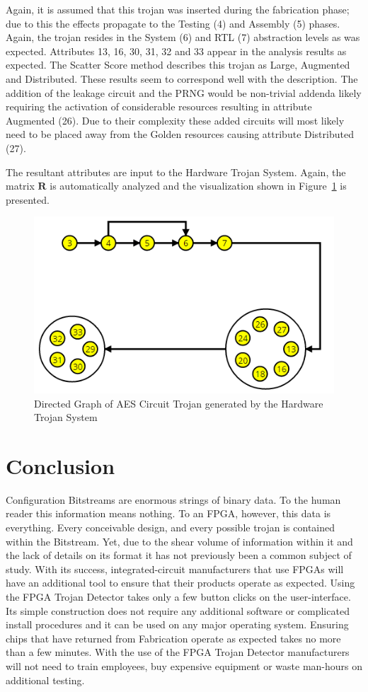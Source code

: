 \documentclass[journal, hidelinks]{IEEEtran}
\begin{document}
Again, it is assumed that this trojan was inserted during the fabrication phase; due to this the effects propagate to the Testing (4) and Assembly (5) phases.
Again, the trojan resides in the System (6) and RTL (7) abstraction levels as was expected.
Attributes 13, 16, 30, 31, 32 and 33 appear in the analysis results as expected.
The Scatter Score method describes this trojan as Large, Augmented and Distributed. 
These results seem to correspond well with the description. 
The addition of the leakage circuit and the PRNG would be non-trivial addenda likely requiring the activation of considerable resources resulting in attribute Augmented (26).
Due to their complexity these added circuits will most likely need to be placed away from the Golden resources causing attribute Distributed (27).

The resultant attributes are input to the Hardware Trojan System.
Again, the matrix $\mathbf{R}$ is automatically analyzed and the visualization shown in Figure~\ref{fig:aesVisual} is presented.
\begin{figure}[h]
	\centering
	\includegraphics[width=0.91\linewidth]{Figures/aesVisual}
	\caption{Directed Graph of AES Circuit Trojan generated by the Hardware Trojan System}
	\label{fig:aesVisual}
\end{figure}

\section{Conclusion} \label{sec:conclusion}
Configuration Bitstreams are enormous strings of binary data.
To the human reader this information means nothing.
To an FPGA, however, this data is everything.
Every conceivable design, and every possible trojan is contained within the Bitstream.
Yet, due to the shear volume of information within it and the lack of details on its format it has not previously been a common subject of study.
With its success, integrated-circuit manufacturers that use FPGAs will have an additional tool to ensure that their products operate as expected.
Using the FPGA Trojan Detector takes only a few button clicks on the user-interface.
Its simple construction does not require any additional software or complicated install procedures and it can be used on any major operating system.
Ensuring chips that have returned from Fabrication operate as expected takes no more than a few minutes.
With the use of the FPGA Trojan Detector manufacturers will not need to train employees, buy expensive equipment or waste man-hours on additional testing.
\end{document}
